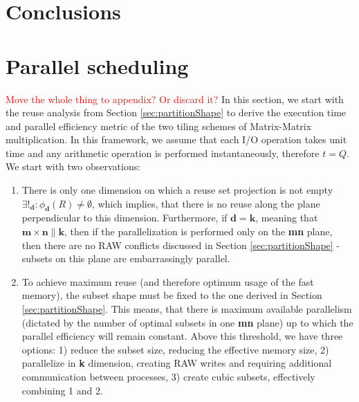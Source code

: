 \documentclass[sigplan,review,anonymous]{acmart}\settopmatter{printfolios=true,printccs=false,printacmref=false}
\newcommand\todo[1]{\textcolor{red}{#1}}
\begin{document}
\section{Conclusions}

%


%




\appendix
\section{Parallel scheduling}
\todo{Move the whole thing to appendix? Or discard it?}
In this section, we start with the reuse analysis from Section 
\ref{sec:partitionShape} 
to derive the execution time and parallel efficiency metric of the two tiling 
schemes of Matrix-Matrix multiplication. In this framework, we assume that each 
I/O operation takes unit time and any arithmetic operation is performed 
instantaneously, therefore $t = Q$. We start with two observations:

\begin{enumerate}
\item There is only one dimension on 
which a reuse set projection is not empty $\exists!_{\mathbf{d}}: 
\phi_{\mathbf{d}}(R) \ne 
\emptyset$, which implies, that there is no reuse along the plane 
perpendicular 
to this dimension. Furthermore, if $\mathbf{d} = \mathbf{k}$, meaning that 
$\mathbf{m} \times \mathbf{n} \parallel \mathbf{k}$, then if the 
parallelization is performed only on the \textbf{mn} plane, then there are 
no RAW 
conflicts discussed in Section \ref{sec:partitionShape} - subsets on 
this 
plane are embarrassingly parallel. 
\item To achieve maximum reuse (and therefore optimum usage 
of the fast memory), the subset shape must be fixed to the one derived 
in 
Section \ref{sec:partitionShape}. This means, that there is maximum 
available 
parallelism (dictated by the number of optimal subsets in one 
\textbf{mn} plane) up to which the parallel efficiency will remain 
constant. Above this threshold, we have three options: 1) reduce the 
subset size, reducing the effective memory size, 2) parallelize in 
\textbf{k} dimension, creating RAW writes and requiring additional 
communication between processes, 3) create cubic subsets, effectively 
combining 1 and 2.
\end{enumerate}
\end{document}
